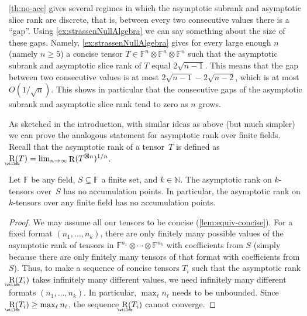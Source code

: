 \documentclass{daj}
\DeclareMathOperator{\asymprank}{\underaccent{\wtilde}{R}}
\DeclareMathOperator{\tensorrank}{R}
\newcommand{\FF}{\mathbb{F}}
\begin{document}
\begin{remark}
    \autoref{th:no-acc} gives several regimes in which the asymptotic subrank and asymptotic slice rank are discrete, that is, between every two consecutive values there is a ``gap''.
    Using \autoref{ex:strassenNullAlgebra} we can say something about the size of these gaps. Namely,
    \autoref{ex:strassenNullAlgebra} gives for every large enough $n$ (namely $n\geq5$) a concise tensor $T \in \FF^n \otimes \FF^n \otimes \FF^n$ such that the asymptotic subrank and asymptotic slice rank of $T$ equal $2\sqrt{n-1}$. This means that the gap between two consecutive values is at most $2\sqrt{n-1} - 2\sqrt{n-2}$, which is at most $O(1/\sqrt{n})$.
    This shows in particular that the consecutive gaps of the asymptotic subrank and asymptotic slice rank tend to zero as $n$ grows.
\end{remark}

As sketched in the introduction, with similar ideas as above (but much simpler) we can prove the analogous statement for asymptotic rank over finite fields.
Recall that the asymptotic rank of a tensor~$T$ is defined as $\asymprank(T) = \lim_{n\to\infty} \tensorrank(T^{\boxtimes n})^{1/n}$.

\begin{theorem}\label{th:asympran-disc}
    Let $\FF$ be any field, $S\subseteq\FF$ a finite set, and $k \in \mathbb{N}$. The asymptotic rank on $k$-tensors over~$S$ has no accumulation points. 
    In particular, the asymptotic rank on $k$-tensors over any finite field has no accumulation points.
\end{theorem}
\begin{proof} %
We may assume all our tensors to be concise (\autoref{lem:equiv-concise}).
For a fixed format $(n_1, \ldots, n_k)$, there are only finitely many possible values of the asymptotic rank of tensors in $\FF^{n_1} \otimes \cdots \otimes \FF^{n_k}$ with coefficients from $S$ (simply because there are only finitely many tensors of that format with coefficients from $S$). Thus, to make a sequence of concise tensors $T_i$ such that the asymptotic rank $\asymprank(T_i)$ takes infinitely many different values, we need infinitely many different formats $(n_1,\ldots, n_k)$. In particular, $\max_\ell n_\ell$ needs to be unbounded. Since $\asymprank(T_i) \geq \max_\ell n_\ell$, the sequence $\asymprank(T_i)$ cannot converge.
\end{proof}
\end{document}
